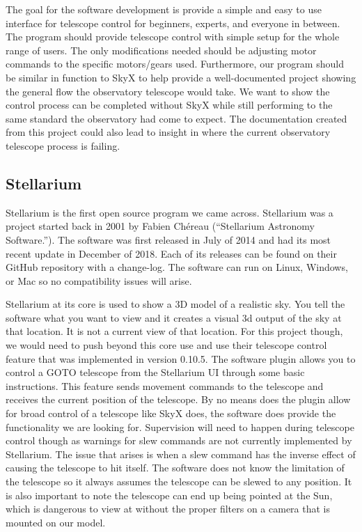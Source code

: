 \documentclass[12pt]{report}
\begin{document}
The goal for the software development is provide a simple and easy to use interface for telescope control for beginners, experts, and everyone in between. The program should provide telescope control with simple setup for the whole range of users. The only modifications needed should be adjusting motor commands to the specific motors/gears used. Furthermore, our program should be similar in function to SkyX to help provide a well-documented project showing the general flow the observatory telescope would take. We want to show the control process can be completed without SkyX while still performing to the same standard the observatory had come to expect. The documentation created from this project could also lead to insight in where the current observatory telescope process is failing.

\subsection*{Stellarium}

Stellarium is the first open source program we came across. Stellarium was a project started back in 2001 by Fabien Chéreau (“Stellarium Astronomy Software.”). The software was first released in July of 2014 and had its most recent update in December of 2018. Each of its releases can be found on their GitHub repository with a change-log. The software can run on Linux, Windows, or Mac so no compatibility issues will arise.

Stellarium at its core is used to show a 3D model of a realistic sky. You tell the software what you want to view and it creates a visual 3d output of the sky at that location. It is not a current view of that location. For this project though, we would need to push beyond this core use and use their telescope control feature that was implemented in version 0.10.5. The software plugin allows you to control a GOTO telescope from the Stellarium UI through some basic instructions. This feature sends movement commands to the telescope and receives the current position of the telescope. By no means does the plugin allow for broad control of a telescope like SkyX does, the software does provide the functionality we are looking for. Supervision will need to happen during telescope control though as warnings for slew commands are not currently implemented by Stellarium. The issue that arises is when a slew command has the inverse effect of causing the telescope to hit itself. The software does not know the limitation of the telescope so it always assumes the telescope can be slewed to any position. It is also important to note the telescope can end up being pointed at the Sun, which is dangerous to view at without the proper filters on a camera that is mounted on our model.
\end{document}
